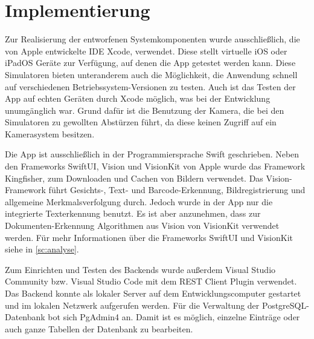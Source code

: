 \documentclass[notables, nomenclature, oneside, 150]{HSMW-Thesis}
\begin{document}
	\section{Implementierung}\label{sc:implementierung}
		Zur Realisierung der entworfenen Systemkomponenten wurde ausschließlich, die von Apple entwickelte IDE Xcode, verwendet. Diese stellt virtuelle iOS oder iPadOS Geräte zur Verfügung, auf denen die App getestet werden kann. Diese Simulatoren bieten unteranderem auch die Möglichkeit, die Anwendung schnell auf verschiedenen Betriebssystem-Versionen zu testen. Auch ist das Testen der App auf echten Geräten durch Xcode möglich, was bei der Entwicklung unumgänglich war. Grund dafür ist die Benutzung der Kamera, die bei den Simulatoren zu gewollten Abstürzen führt, da diese keinen Zugriff auf ein Kamerasystem besitzen.
		
		Die App ist ausschließlich in der Programmiersprache Swift geschrieben. Neben den Frameworks SwiftUI, Vision und VisionKit von Apple wurde das Framework Kingfisher, zum Downloaden und Cachen von Bildern verwendet. Das Vision-Framework führt Gesichts-, Text- und Barcode-Erkennung, Bildregistrierung und allgemeine Merkmalsverfolgung durch. Jedoch wurde in der App nur die integrierte Texterkennung benutzt. Es ist aber anzunehmen, dass zur Dokumenten-Erkennung  Algorithmen aus Vision von VisionKit verwendet werden. Für mehr Informationen über die Frameworks SwiftUI und VisionKit siehe in \autoref{sc:analyse}.
		
		Zum Einrichten und Testen des Backends wurde außerdem Visual Studio Community bzw. Visual Studio Code mit dem REST Client Plugin verwendet. Das Backend konnte als lokaler Server auf dem Entwicklungscomputer gestartet und im lokalen Netzwerk aufgerufen werden. Für die Verwaltung der PostgreSQL-Datenbank bot sich PgAdmin4 an. Damit ist es möglich, einzelne Einträge oder auch ganze Tabellen der Datenbank zu bearbeiten.
\end{document}
